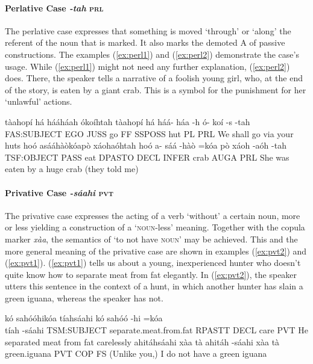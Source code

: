 \documentclass[a4paper, 12pt, oneside]{memoir}
\newcommand{\emh}[1]{\textit{#1}}
\begin{document}
\paragraph{Perlative Case \emh{-tah} \textsc{prl}}\label{s:perlative}
The perlative case expresses that something is moved `through' or `along' the referent of the noun that is marked. It also marks the demoted A of passive constructions. The examples (\ref{ex:perl1}) and (\ref{ex:perl2}) demonstrate the case's usage. While (\ref{ex:perl1}) might not need any further explanation, (\ref{ex:perl2}) does. There, the speaker tells a narrative of a foolish young girl, who, at the end of the story, is eaten by a giant crab. This is a symbol for the punishment for her `unlawful' actions.
\begin{examples}
\newbaarucmd{\cl}{\baarujuncture{\texttt{==}}}
\ex \label{ex:perl1}
\words tàahopí há hááháah ókoíhtah
\bits tàahopí há háá- háa -h ó- koí -s -tah 
\gloss FAS:SUBJECT EGO JUSS go FF SSPOSS hut PL PRL
\tr We shall go via your huts
\ex \label{ex:perl2}
\words hoó asááhàòkóapò xáohaóhtah
\bits hoó a- sáá -hàò =kóa \cl pò xáoh -aóh -tah
\gloss TSF:OBJECT PASS eat DPASTO DECL INFER crab AUGA PRL
\tr She was eaten by a huge crab (they told me)
\end{examples}
\paragraph{Privative Case \emh{-sáahi} \textsc{pvt}}
The privative case expresses the acting of a verb `without' a certain noun, more or less yielding a construction of a `\textsc{noun}-less' meaning. Together with the copula marker \textit{xàa}, the semantics of `to not have \textsc{noun}' may be achieved. This and the more general meaning of the privative case are shown in examples (\ref{ex:pvt2}) and (\ref{ex:pvt1}). (\ref{ex:pvt1}) tells us about a young, inexperienced hunter who doesn't quite know how to separate meat from fat elegantly. In (\ref{ex:pvt2}), the speaker utters this sentence in the context of a hunt, in which another hunter has slain a green iguana, whereas the speaker has not.
\begin{examples}
\ex \label{ex:pvt1}
\words kó sahóóhikóa tíahsáahi
\bits kó sahóó -hi =kóa \\ tíah -sáahi
\gloss TSM:SUBJECT separate.meat.from.fat RPASTT DECL care PVT
\tr He separated meat from fat carelessly
\ex \label{ex:pvt2}
\words ahitáhsáahi xàa tà
\bits ahitáh -sáahi xàa tà
\gloss green.iguana PVT COP FS
\tr (Unlike you,) I do not have a green iguana
\end{examples}
\end{document}
